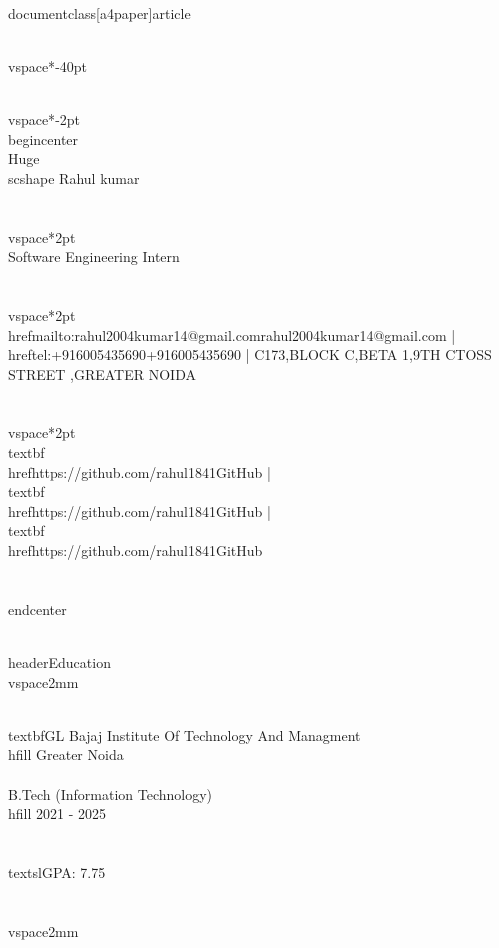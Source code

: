 \\documentclass[a4paper]{article}
\begin{document}
\\vspace*{-40pt}

%
%
  \\vspace*{-2pt}
  \\begin{center}
    {\\Huge \\scshape {Rahul kumar}}\\\\
    \\vspace*{2pt}
    \\ {Software Engineering Intern}\\\\
    \\vspace*{2pt}
    \\href{mailto:rahul2004kumar14@gmail.com}{rahul2004kumar14@gmail.com} | \\href{tel:+916005435690}{+916005435690} | C173,BLOCK C,BETA 1,9TH CTOSS STREET ,GREATER NOIDA\\\\
    \\vspace*{2pt}
    \\textbf{\\href{https://github.com/rahul1841}{GitHub}} | \\textbf{\\href{https://github.com/rahul1841}{GitHub}} | \\textbf{\\href{https://github.com/rahul1841}{GitHub}}\\\\
  \\end{center}

%
%
\\header{Education}
\\vspace{2mm}

\\textbf{GL Bajaj Institute Of Technology And Managment}\\hfill Greater Noida\\\\
B.Tech (Information Technology) \\hfill 2021 - 2025\\\\
\\textsl{GPA: 7.75}\\\\
\\vspace{2mm}
\end{document}
